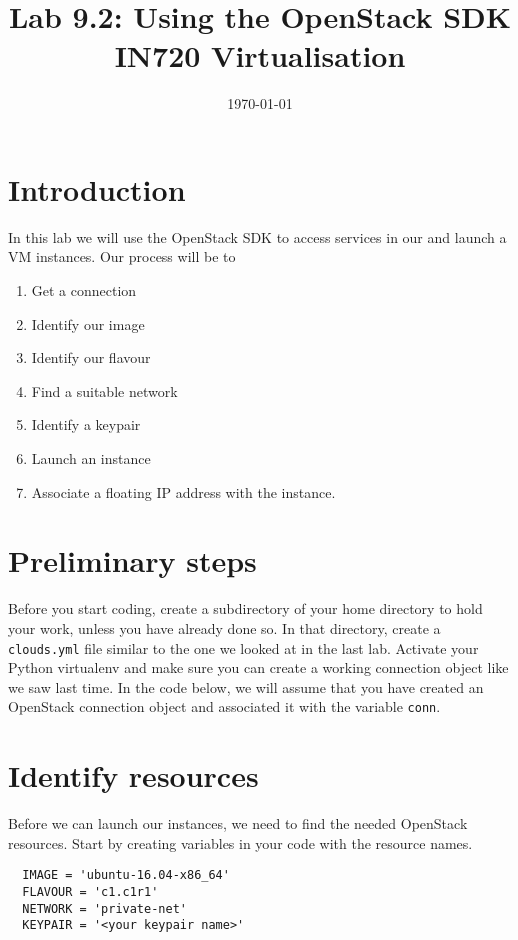 \documentclass{article}
\begin{document}
\title{Lab 9.2: Using the OpenStack SDK \\ IN720 Virtualisation}
\date{\today}
\maketitle

\section*{Introduction}
In this lab we will use the OpenStack SDK to access services in our and launch a VM instances. Our process will be to

\begin{enumerate}
  \item Get a connection 
  \item Identify our image
  \item Identify our flavour
  \item Find a suitable network
  \item Identify a keypair
  \item Launch an instance
  \item Associate a floating IP address with the instance.
\end{enumerate}

\section{Preliminary steps}
Before you start coding, create a subdirectory of your home directory to hold your work, unless you have already done so. In that directory, create a \texttt{clouds.yml} file similar to the one we looked at in the last lab. Activate your Python virtualenv and make sure you can create a working connection object like we saw last time. In the code below, we will assume that you have created an OpenStack connection object and associated it with the variable \texttt{conn}.

\section{Identify resources}
Before we can launch our instances, we need to find the needed OpenStack resources. Start by creating variables in your code with the resource names.

\begin{verbatim}
  IMAGE = 'ubuntu-16.04-x86_64'
  FLAVOUR = 'c1.c1r1'
  NETWORK = 'private-net'
  KEYPAIR = '<your keypair name>'
\end{verbatim}
\end{document}
